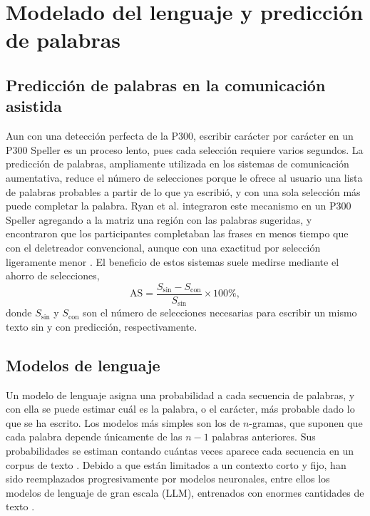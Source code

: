 \section[MODELADO DEL LENGUAJE Y PREDICCIÓN DE PALABRAS]{Modelado del lenguaje y predicción de
palabras}
\label{sec:lenguaje}

\subsection{Predicción de palabras en la comunicación asistida}

Aun con una detección perfecta de la P300, escribir carácter por carácter en un P300 Speller es un
proceso lento, pues cada selección requiere varios segundos. La predicción de palabras, ampliamente
utilizada en los sistemas de comunicación aumentativa, reduce el número de selecciones porque le
ofrece al usuario una lista de palabras probables a partir de lo que ya escribió, y con una sola
selección más puede completar la palabra. Ryan et al. integraron
este mecanismo en un P300 Speller agregando a la matriz una región con las palabras sugeridas, y
encontraron que los participantes completaban las frases en menos tiempo que con el deletreador
convencional, aunque con una exactitud por selección ligeramente menor \cite{ryan2011}. El
beneficio de estos sistemas suele medirse mediante el ahorro de selecciones,
\begin{equation}
\text{AS} = \frac{S_{\text{sin}} - S_{\text{con}}}{S_{\text{sin}}}\times100\%,
\label{eq:ahorro}
\end{equation}
donde $S_{\text{sin}}$ y $S_{\text{con}}$ son el número de selecciones necesarias para escribir un
mismo texto sin y con predicción, respectivamente.

\subsection{Modelos de lenguaje}

Un modelo de lenguaje asigna una probabilidad a cada secuencia de palabras, y con ella se puede
estimar cuál es la palabra, o el carácter, más probable dado lo que se ha escrito. Los modelos más simples
son los de $n$-gramas, que suponen que cada palabra depende únicamente de las $n-1$ palabras
anteriores. Sus probabilidades se estiman contando cuántas veces aparece cada secuencia en un
corpus de texto \cite{jurafsky2025}. Debido a que están limitados a un contexto corto y fijo,
han sido reemplazados progresivamente por modelos neuronales, entre ellos los modelos de lenguaje
de gran escala (LLM), entrenados con enormes cantidades de texto \cite{brown2020}.

